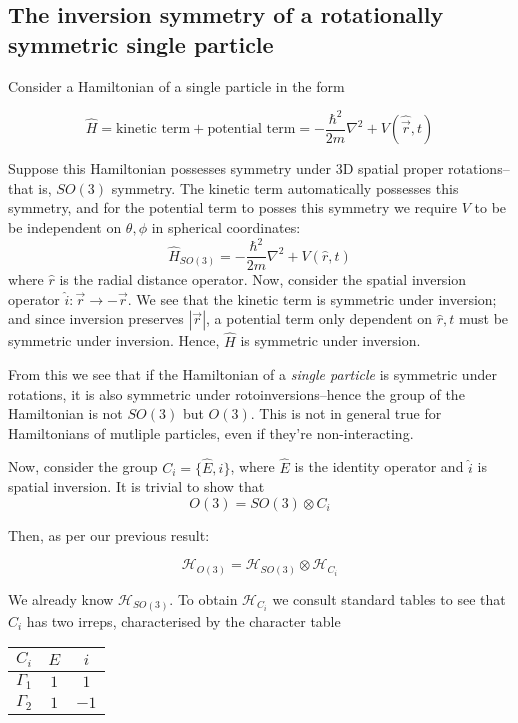 \documentclass[12pt]{article}
\begin{document}
	\subsection{The inversion symmetry of a rotationally symmetric single particle}
	
	Consider a Hamiltonian of a single particle in the form
	
	$$\hat{H}=\text{kinetic term}+\text{potential term}=-\frac{\hbar^2}{2m}\nabla^2+V(\hat{\vec{r}}, t)$$
	
	Suppose this Hamiltonian possesses symmetry under 3D spatial proper rotations--that is, $SO(3)$ symmetry. The kinetic term automatically possesses this symmetry, and for the potential term to posses this symmetry we require $V$ to be be independent on $\theta,\phi$ in spherical coordinates:
	$$\hat{H}_{SO(3)}=-\frac{\hbar^2}{2m}\nabla^2+V(\hat{r}, t)$$
	where $\hat{r}$ is the radial distance operator. Now, consider the spatial inversion operator $\hat{i}:\vec{r}\to-\vec{r}$. We see that the kinetic term is symmetric under inversion; and since inversion preserves $|\vec{r}|$, a potential term only dependent on $\hat{r},t$ must be symmetric under inversion. Hence, $\hat{H}$ is symmetric under inversion.
	
	From this we see that if the Hamiltonian of a \textit{single particle} is symmetric under rotations, it is also symmetric under rotoinversions--hence the group of the Hamiltonian is not $SO(3)$ but $O(3)$. This is not in general true for Hamiltonians of mutliple particles, even if they're non-interacting.
	
	Now, consider the group $C_i=\{\hat{E},\hat{i}\}$, where $\hat{E}$ is the identity operator and $\hat{i}$ is spatial inversion. It is trivial to show that
	$$O(3)=SO(3)\otimes C_i$$
	
	Then, as per our previous result:
	
	$$\mathcal{H}_{O(3)}=\mathcal{H}_{SO(3)}\otimes\mathcal{H}_{C_i}$$
	
	We already know $\mathcal{H}_{SO(3)}$. To obtain $\mathcal{H}_{C_i}$ we consult standard tables \cite[p.138]{altmann_inversion_group} to see that $C_i$ has two irreps, characterised by the character table
	
	\begin{center}
	\begin{tabular}{c | c c}
	$C_i$ & $E$ & $i$\\
	\hline
	$\Gamma_1$ & $1$ & $1$\\
	$\Gamma_2$ & $1$ & $-1$
	\end{tabular}
	\end{center}
	
\end{document}

